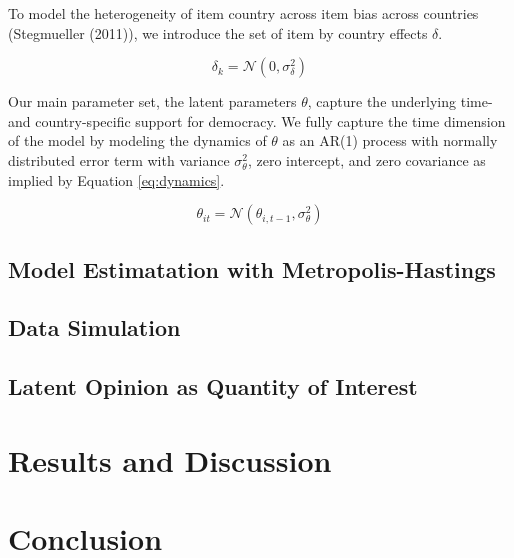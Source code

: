 \documentclass[12pt,english,a4paper,oneside]{article}
\theoremstyle{definition}
\theoremstyle{definition}
\theoremstyle{definition}
\theoremstyle{definition}
\theoremstyle{remark}
\begin{document}
\noindent
To model the heterogeneity of item country across item bias across countries (Stegmueller (2011)), we introduce the set of item by country effects \(\delta\).

\begin{equation}
\label{eq:country-effects}
\delta_k = \mathcal{N}(0, \sigma_{\delta}^2)
\end{equation}

\noindent
Our main parameter set, the latent parameters \(\theta\), capture the underlying time- and country-specific support for democracy. We fully capture the time dimension of the model by modeling the dynamics of \(\theta\) as an AR(1) process with normally distributed error term with variance \(\sigma_{\theta}^2\), zero intercept, and zero covariance as implied by Equation \eqref{eq:dynamics}.

\begin{equation}
\label{eq:dynamics}
\theta_{it} = \mathcal{N}(\theta_{i,t-1}, \sigma_{\theta}^2)
\end{equation}

\hypertarget{model-estimatation-with-metropolis-hastings}{%
\subsection{Model Estimatation with Metropolis-Hastings}\label{model-estimatation-with-metropolis-hastings}}

\hypertarget{data-simulation}{%
\subsection{Data Simulation}\label{data-simulation}}

\hypertarget{latent-opinion-as-quantity-of-interest}{%
\subsection{Latent Opinion as Quantity of Interest}\label{latent-opinion-as-quantity-of-interest}}

\hypertarget{results-and-discussion}{%
\section{Results and Discussion}\label{results-and-discussion}}

\hypertarget{conclusion}{%
\section{Conclusion}\label{conclusion}}
\end{document}
